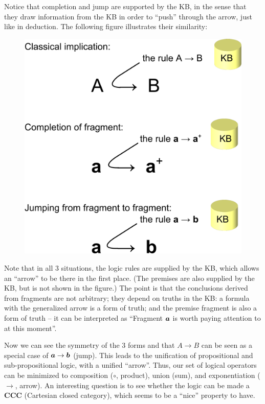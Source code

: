 Notice that completion and jump are supported by the KB, in the sense that they draw information from the KB in order to ``push'' through the arrow, just like in deduction.  The following figure illustrates their similarity:
\begin{figure}[H]
\centering
\includegraphics[scale=0.7]{fragments-inference-rules.png}
\end{figure}

Note that in all 3 situations, the logic rules are supplied by the KB, which allows an ``arrow'' to be there in the first place.  (The premises are also supplied by the KB, but is not shown in the figure.)  The point is that the conclusions derived from fragments are not arbitrary;  they depend on truths in the KB:  a formula with the generalized arrow is a form of truth;  and the premise fragment is also a form of truth -- it can be interpreted as ``Fragment $\mbox{\boldmath$a$}$ is worth paying attention to at this moment''.  

Now we can see the symmetry of the 3 forms and that $A \rightarrow B$ can be seen as a special case of $\mbox{\boldmath$a$} \rightarrow \mbox{\boldmath$b$}$ (jump).  This leads to the unification of propositional and sub-propositional logic, with a unified ``arrow''.  Thus, our set of logical operators can be minimized to composition ($\circ$, product), union (sum), and exponentiation ($\rightarrow$, arrow).  An interesting question is to see whether the logic can be made a \textbf{CCC} (Cartesian closed category), which seems to be a ``nice'' property to have.

